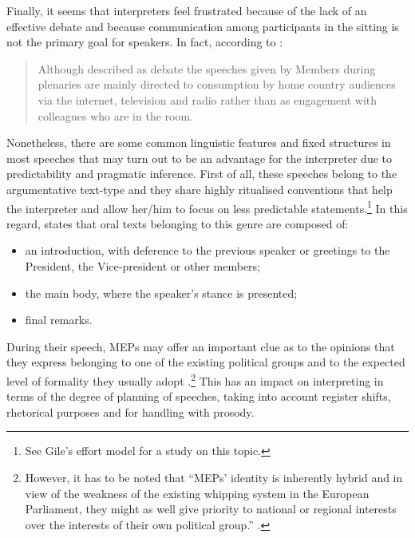 \documentclass[output=paper]{langscibook}
\begin{document}
Finally, it seems that interpreters feel frustrated because of the lack of an effective debate and because communication among participants in the sitting is not the primary goal for speakers. In fact, according to \citet{Kent2009}:

\begin{quote}
Although described as debate the speeches given by Members during plenaries are mainly directed to consumption by home country audiences via the internet, television and radio rather than as engagement with colleagues who are in the room. \citep[57]{Kent2009}
\end{quote}

\largerpage
Nonetheless, there are some common linguistic features and fixed structures in most speeches that may turn out to be an advantage for the interpreter due to predictability and pragmatic inference. First of all, these speeches belong to the argumentative text-type and they share highly ritualised conventions that help the interpreter and allow her/him to focus on less predictable statements.\footnote{See Gile’s effort model \citep[169--170]{Gile1995} for a study on this topic.} In this regard, \citet{Vuorikoski2004} states that oral texts belonging to this genre are composed of:

\begin{itemize}
\item
an introduction, with deference to the previous speaker or greetings to the President, the Vice-president or other members;
\item
the main body, where the speaker’s stance is presented;
\item
final remarks.
\end{itemize}\clearpage

During their speech, MEPs may offer an important clue as to the opinions that they express belonging to one of the existing political groups and to the expected level of formality they usually adopt \citep[66]{Marzocchi1998}.\footnote{However, it has to be noted that “MEPs’ identity is inherently hybrid and in view of the weakness of the existing whipping system in the European Parliament, they might as well give priority to national or regional interests over the interests of their own political group.” \citep[105--108]{Beaton2007}.} This has an impact on interpreting in terms of the degree of planning of speeches, taking into account register shifts, rhetorical purposes and for handling with prosody.
\end{document}
